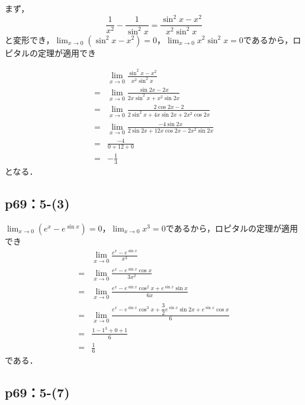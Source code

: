 \documentclass[uplatex,dvipdfmx,a4paper,10pt,fleqn]{jsarticle}
\begin{document}
    \begin{tleftbar}
        まず，
        \[
            \frac{1}{x^2}-\frac{1}{\sin ^2 x} = \frac{\sin ^2 x-x^2}{x^2 \sin ^2 x}
        \]
        と変形でき，$\lim_{x \to 0} (\sin ^2 x-x^2)=0$，$\lim_{x \to 0} x^2 \sin ^2 x=0$であるから，ロピタルの定理が適用でき

        \begin{align*} 
            &\lim_{x \to 0} \frac{\sin ^2 x - x^2}{x^2 \sin ^2 x} \\
            =&\lim_{x \to 0} \frac{\sin 2x - 2x}{2x \sin ^2 x + x^2 \sin 2 x} \\
            =& \lim_{x \to 0} \frac{2\cos 2x -2}{2 \sin ^2 x + 4x \sin 2x +2x^2 \cos 2x} \\
            =& \lim_{x \to 0} \frac{-4\sin 2x}{2\sin 2x + 12x\cos 2x  -2x^2 \sin 2x } \\
            =& \frac{-4}{0+12+0} \\
            =& -\frac{1}{3}
        \end{align*} 
        となる．
    \end{tleftbar}


    \subsection*{p69：5-(3)}

    \begin{tleftbar}
        $\lim_{x \to 0} (e^x - e^{\sin x})=0$，$\lim_{x \to 0} x^3 =0$であるから，ロピタルの定理が適用でき
        \begin{align*} 
            & \lim_{x \to 0} \frac{e^x - e^{\sin x}}{x^3} \\
            =& \lim_{x \to 0} \frac{e^x - e^{\sin x} \cos x}{3x^2} \\
            =& \lim_{x \to 0} \frac{e^x - e^{\sin x } \cos^2 x + e^{\sin x} \sin x}{6x} \\
            =& \lim_{x \to 0} \frac{e^x - e^{\sin x} \cos ^3 x +\dfrac{3}{2}e^{\sin x} \sin 2x  + e^{\sin x} \cos x}{6} \\
            =&\frac{1-1^3 +0 +1}{6} \\
            =&\frac{1}{6}
        \end{align*} 
        である．
    \end{tleftbar}

    \subsection*{p69：5-(7)}
\end{document}
